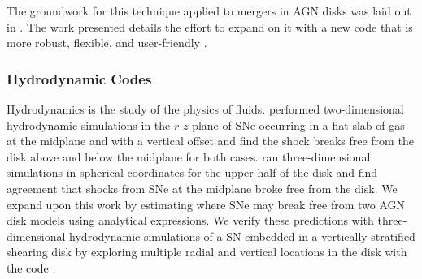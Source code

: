 The groundwork for this technique applied to mergers in AGN disks was laid out in \citet{McKernan+20a,McKernan+20b}.
The work presented details the effort to expand on it with a new code that is more robust, flexible, and user-friendly \citep{McKernan+25-mcfactsI,Cook+25,Delfavero+25-mcfactsIII,McPike+26-mcfactsIV}.

\subsubsection{Hydrodynamic Codes}

Hydrodynamics is the study of the physics of fluids.
\citet{Grishin+21} performed two-dimensional hydrodynamic simulations in the $r$-$z$ plane of SNe occurring in a flat slab of gas at the midplane and with a vertical offset and find the shock breaks free from the disk above and below the midplane for both cases.
\citet{Moranchel+21} ran three-dimensional simulations in spherical coordinates for the upper half of the disk and find agreement that shocks from SNe at the midplane broke free from the disk.
We expand upon this work by estimating where SNe may break free from two AGN disk models using analytical expressions.
We verify these predictions with three-dimensional hydrodynamic simulations of a SN embedded in a vertically stratified shearing disk by exploring multiple radial and vertical locations in the disk with the  code \citep{Stone+08,StoneGardiner10}.

